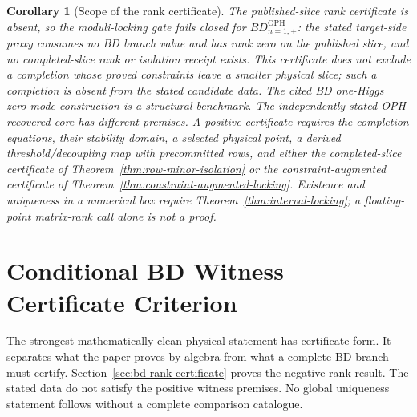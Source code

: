 \documentclass[11pt]{article}
\newtheorem{corollary}[theorem]{Corollary}
\theoremstyle{remark}
\theoremstyle{plain}
\newcommand{\OPH}{\mathrm{OPH}}
\begin{document}
\begin{corollary}[Scope of the rank certificate]
The published-slice rank certificate is absent, so the moduli-locking gate fails closed for
\(BD_{n=1,+}^{\OPH}\): the stated target-side proxy consumes no BD branch value and has rank
zero on the published slice, and no completed-slice rank or isolation receipt exists. This certificate does not exclude a completion
whose proved constraints leave a smaller physical slice; such a completion is absent from the
stated candidate data. The cited BD one-Higgs zero-mode construction is a structural benchmark.
The independently stated OPH recovered core has different premises. A positive certificate
requires the completion equations, their stability domain, a selected physical point, a derived
threshold/decoupling map with precommitted rows, and either the completed-slice certificate of
Theorem~\ref{thm:row-minor-isolation} or the constraint-augmented certificate of
Theorem~\ref{thm:constraint-augmented-locking}. Existence and uniqueness in a numerical box require
Theorem~\ref{thm:interval-locking}; a floating-point matrix-rank call alone is not a proof.
\end{corollary}

\section{Conditional BD Witness Certificate Criterion}

The strongest mathematically clean physical statement has certificate form. It separates what the
paper proves by algebra from what a complete BD branch must certify.
Section~\ref{sec:bd-rank-certificate} proves the negative rank result. The stated data do not
satisfy the positive witness premises. No global uniqueness statement follows without a complete
comparison catalogue.
\end{document}
